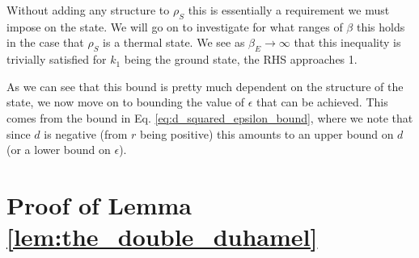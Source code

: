 \documentclass{article}
\begin{document}
Without adding any structure to $\rho_S$ this is essentially a requirement we must impose on the state. We will go on to investigate for what ranges of $\beta$ this holds in the case that $\rho_S$ is a thermal state. We see as $\beta_E \to \infty$ that this inequality is trivially satisfied for $k_1$ being the ground state, the RHS approaches 1. 

As we can see that this bound is pretty much dependent on the structure of the state, we now move on to bounding the value of $\epsilon$ that can be achieved. This comes from the bound in Eq. \eqref{eq:d_squared_epsilon_bound}, where we note that since $d$ is negative (from $r$ being positive) this amounts to an upper bound on $d$ (or a lower bound on $\epsilon$). 





\appendix
\section{Proof of Lemma \ref{lem:the_double_duhamel}}
\end{document}
